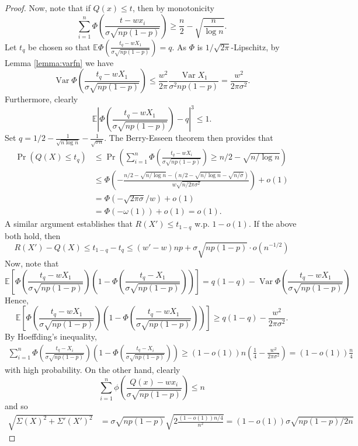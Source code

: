 \documentclass{article}
\theoremstyle{remark}
\newcommand{\E}{\mathbb{E}}
\DeclareMathOperator{\var}{Var}
\newcommand{\1}{\mathbbm{1}}
\begin{document}
\begin{proof}
    Now, note that if $Q(x) \le t$, then by monotonicity
    \[\sum_{i=1}^n \Phi\left(\frac{t - w x_i}{\sigma \sqrt{np(1-p)}}\right) \ge \frac{n}{2} - \sqrt{\frac{n}{\log n}}.\]
    Let $t_q$ be chosen so that $\E \Phi\left(\frac{t_q - w X_1}{\sigma\sqrt{np(1-p)}}\right) = q$. As $\Phi$ is $1/\sqrt{2\pi}$-Lipschitz, by Lemma \ref{lemma:varfn} we have
    \[\var \Phi\left(\frac{t_q-w X_1}{\sigma \sqrt{np(1-p)}}\right) \le \frac{w^2}{2\pi} \frac{\var X_1}{\sigma^2 np(1-p)} = \frac{w^2}{2\pi \sigma^2}.\] 
    Furthermore, clearly
    \[\E \left|\Phi\left(\frac{t_q-w X_1}{\sigma \sqrt{np(1-p)}}\right) - q\right|^3 \le 1.\]
    Set $q = 1/2 - \frac{1}{\sqrt{n \log n}} - \frac{1}{\sqrt{\sigma n}}$. The Berry-Esseen theorem then provides that
    \begin{align*}
        \Pr(Q(X) \le t_q) &\le \Pr\left(\sum_{i=1}^n \Phi\left(\frac{t_q-wX_i}{\sigma \sqrt{np(1-p)}}\right) \ge n/2 - \sqrt{n/\log n}\right)\\
        &\le \Phi\left( -\frac{n/2 - \sqrt{n/\log n} - (n/2 - \sqrt{n / \log n} - \sqrt{n / \sigma})}{w \sqrt{n / 2\pi \sigma^2}}\right) + o(1)\\
        &= \Phi\left(-\sqrt{2 \pi \sigma} / w\right) + o(1)\\
        &= \Phi(-\omega(1)) + o(1) = o(1).
    \end{align*}
    A similar argument establishes that $R(X') \le t_{1-q}$ w.p. $1 - o(1)$. If the above both hold, then
    \[R(X') - Q(X) \le t_{1-q} - t_{q} \le (w' - w)np + \sigma \sqrt{np(1-p)} \cdot o(n^{-1/2})\]
    Now, note that
    \[\E \left[\Phi(\frac{t_q-wX_1}{\sigma \sqrt{np(1-p)}}) \left(1-\Phi(\frac{t_q-X_1}{\sigma \sqrt{np(1-p)}})\right)\right] = q(1-q) - \var \Phi\left(\frac{t_q-wX_1}{\sigma \sqrt{np(1-p)}}\right)\]
    Hence,
    \[\E \left[\Phi(\frac{t_q-wX_1}{\sigma \sqrt{np(1-p)}}) \left(1-\Phi(\frac{t_q-wX_1}{\sigma \sqrt{np(1-p)}})\right)\right] \ge q(1-q) - \frac{w^2}{2\pi \sigma^2}.\]
    By Hoeffding's inequality,
    \begin{align*}
        \sum_{i=1}^n \Phi(\frac{t_q-X_i}{\sigma \sqrt{np(1-p)}}) \left(1-\Phi(\frac{t_q-X_i}{\sigma \sqrt{np(1-p)}})\right) \ge (1-o(1))n\left(\frac{1}{4} - \frac{w^2}{2\pi \sigma^2}\right) = (1 - o(1)) \frac{n}{4}
    \end{align*} with high probability. On the other hand, clearly
    \[\sum_{i=1}^n \phi\left(\frac{Q(x) - wx_i}{\sigma \sqrt{np(1-p)}}\right) \le n\]
    and so
    \begin{align*}
        \sqrt{\Sigma(X)^2 + \Sigma'(X')^2} &= \sigma \sqrt{np(1-p)} \sqrt{2\frac{(1-o(1))n/4}{n^2}} = (1-o(1)) \sigma \sqrt{ np(1-p) / 2n}

\end{align*}
\end{proof}
\end{document}
